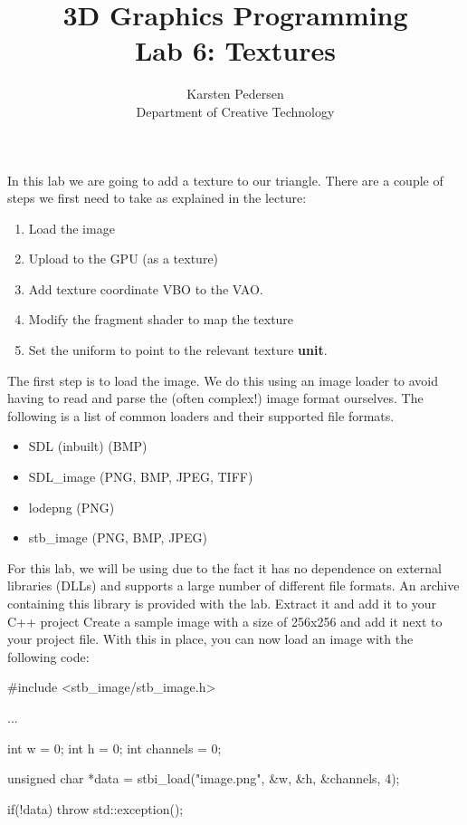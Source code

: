 \documentclass[10pt]{article}
\begin{document}
\title{3D Graphics Programming \\
  \large Lab 6: Textures}

\author{Karsten Pedersen\\ Department of Creative Technology}
\maketitle

In this lab we are going to add a texture to our triangle.
There are a couple of steps we first need to take as explained in the lecture:

\begin{enumerate}
\item Load the image
\item Upload to the GPU (as a texture)
\item Add texture coordinate VBO to the VAO.
\item Modify the fragment shader to map the texture
\item Set the uniform to point to the relevant texture \textbf{unit}.
\end{enumerate}

The first step is to load the image. We do this using an image loader to avoid having to read and parse the (often complex!) image format ourselves.
The following is a list of common loaders and their supported file formats.

\begin{itemize}
\item SDL (inbuilt) (BMP)
\item SDL\_image (PNG, BMP, JPEG, TIFF)
\item lodepng (PNG)
\item stb\_image (PNG, BMP, JPEG)
\end{itemize}

For this lab, we will be using  due to the fact it has
no dependence on external libraries (DLLs) and supports a large number
of different file formats. An archive containing this library is provided
with the lab.  Extract it and add it to your C++ project Create a sample
image with a size of 256x256 and add it next to your project file. With
this in place, you can now load an image with the following code:

\begin{Code}

#include <stb_image/stb_image.h>

...

int w = 0;
int h = 0;
int channels = 0;

unsigned char *data = stbi_load("image.png", &w, &h, &channels, 4);

if(!data)
{
  throw std::exception();
}

\end{Code}
\end{document}
